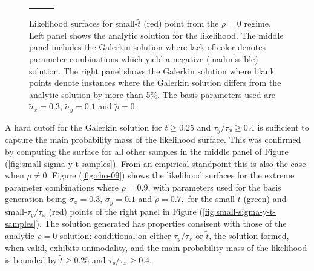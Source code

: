 \documentclass[10pt]{article}
\begin{document}
\begin{enumerate}
\begin{figure}
\begin{tabular}{ccc}
\begin{minipage}{0.33\textwidth}
    \end{minipage}
  \end{tabular}
  \caption{Likelihood surfaces for small-$\tilde{t}$ (red) point
    from the $\rho = 0$ regime. Left panel shows the analytic solution
    for the likelihood. The middle panel includes the Galerkin
    solution where lack of color denotes parameter combinations which
    yield a negative (inadmissible) solution. The right panel shows
    the Galerkin solution where blank points denote instances where
    the Galerkin solution differs from the analytic solution by more
    than 5\%. The basis parameters used are $\tilde{\sigma}_x = 0.3$,
    $\tilde{\sigma}_y = 0.1$ and $\tilde{\rho} = 0$.}
  \label{fig:small-t-sol}
\end{figure}


A hard cutoff for the Galerkin solution for $\tilde{t} \geq 0.25$ and
$\tau_y/\tau_x \geq 0.4$ is sufficient to capture the main probability
mass of the likelihood surface. This was confirmed by computing the
surface for all other samples in the middle panel of Figure
(\ref{fig:small-sigma-y-t-samples}). From an empirical standpoint this
is also the case when $\rho \neq 0$. Figure (\ref{fig:rho-09}) shows
the likelihood surfaces for the extreme parameter combinations where
$\rho = 0.9$, with parameters used for the basis generation being
$\tilde{\sigma}_x = 0.3$, $\tilde{\sigma}_y = 0.1$ and
$\tilde{\rho} = 0.7,$ for the small $\tilde{t}$ (green) and
small-$\tau_y/\tau_x$ (red) points of the right panel in Figure
(\ref{fig:small-sigma-y-t-samples}). The solution generated has
properties consisent with those of the analytic $\rho=0$ solution:
conditional on either $\tau_y/\tau_x$ or $\tilde{t}$, the solution
formed, when valid, exhibits unimodality, and the main probability
mass of the likelihood is bounded by $\tilde{t} \geq 0.25$ and
$\tau_y/\tau_x \geq 0.4$.


\end{enumerate}
\end{document}
